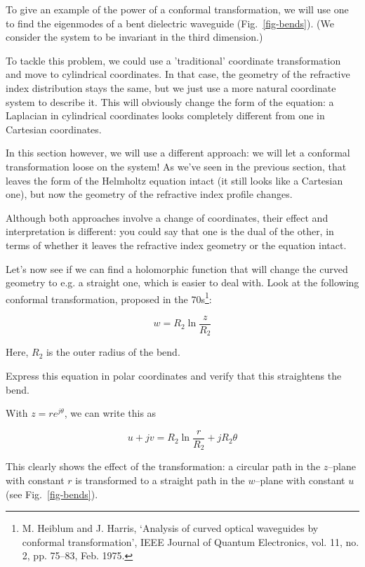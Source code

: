 To give an example of the power of a conformal transformation, we will use one to find the eigenmodes of a bent dielectric waveguide (Fig.~\ref{fig-bends}). (We consider the system to be invariant in the third dimension.)

To tackle this problem, we could use a 'traditional' coordinate transformation and move to cylindrical coordinates. In that case, the geometry of the refractive index distribution stays the same, but we just use a more natural coordinate system to describe it. This will obviously change the form of the equation: a Laplacian in cylindrical coordinates looks completely different from one in Cartesian coordinates.

In this section however, we will use a different approach: we will let a conformal transformation loose on the system! As we've seen in the previous section, that leaves the form of the Helmholtz equation intact (it still looks like a Cartesian one), but now the geometry of the refractive index profile changes. 

Although both approaches involve a change of coordinates, their effect and interpretation is different: you could say that one is the dual of the other, in terms of whether it leaves the refractive index geometry or the equation intact.

Let's now see if we can find a holomorphic function that will change the curved geometry to e.g. a straight one, which is easier to deal with. Look at the following conformal transformation, proposed in the 70s\footnote{M. Heiblum and J. Harris, ‘Analysis of curved optical waveguides by conformal transformation’, IEEE Journal of Quantum Electronics, vol. 11, no. 2, pp. 75–83, Feb. 1975.}:

\begin{equation}
w = R_2 \ln \frac{z}{R_2}
\end{equation} 

Here, $R_2$ is the outer radius of the bend.

\begin{cue}
Express this equation in polar coordinates and verify that this straightens the bend.  
\end{cue}

With $z=r e^{j \theta}$, we can write this as

\begin{equation}
u + jv = R_2 \ln \frac{r}{R_2} + j R_2 \theta
\label{eq-con-trans-bend}
\end{equation} 

This clearly shows the effect of the transformation: a circular path in the $z$--plane with constant $r$ is transformed to a straight path in the $w$--plane with constant $u$ (see Fig.~\ref{fig-bends}).

